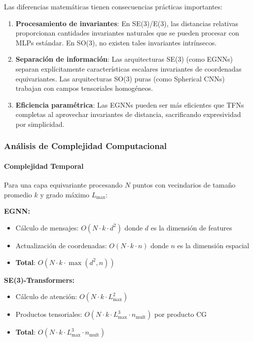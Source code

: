 Las diferencias matemáticas tienen consecuencias prácticas importantes:

\begin{enumerate}
    \item \textbf{Procesamiento de invariantes}: En SE(3)/E(3), las distancias relativas proporcionan cantidades invariantes naturales que se pueden procesar con MLPs estándar. En SO(3), no existen tales invariantes intrínsecos.

    \item \textbf{Separación de información}: Las arquitecturas SE(3) (como EGNNs) separan explícitamente características escalares invariantes de coordenadas equivariantes. Las arquitecturas SO(3) puras (como Spherical CNNs) trabajan con campos tensoriales homogéneos.

    \item \textbf{Eficiencia paramétrica}: Las EGNNs pueden ser más eficientes que TFNs completas al aprovechar invariantes de distancia, sacrificando expresividad por simplicidad.
\end{enumerate}

\subsubsection{Análisis de Complejidad Computacional}

\paragraph{Complejidad Temporal}

Para una capa equivariante procesando $N$ puntos con vecindarios de tamaño promedio $k$ y grado máximo $L_{\max}$:

\textbf{EGNN:}
\begin{itemize}
    \item Cálculo de mensajes: $O(N \cdot k \cdot d^2)$ donde $d$ es la dimensión de features
    \item Actualización de coordenadas: $O(N \cdot k \cdot n)$ donde $n$ es la dimensión espacial
    \item \textbf{Total}: $O(N \cdot k \cdot \max(d^2, n))$
\end{itemize}

\textbf{SE(3)-Transformers:}
\begin{itemize}
    \item Cálculo de atención: $O(N \cdot k \cdot L_{\max}^2)$
    \item Productos tensoriales: $O(N \cdot k \cdot L_{\max}^3 \cdot n_{\text{mult}})$ por producto CG
    \item \textbf{Total}: $O(N \cdot k \cdot L_{\max}^3 \cdot n_{\text{mult}})$
\end{itemize}

